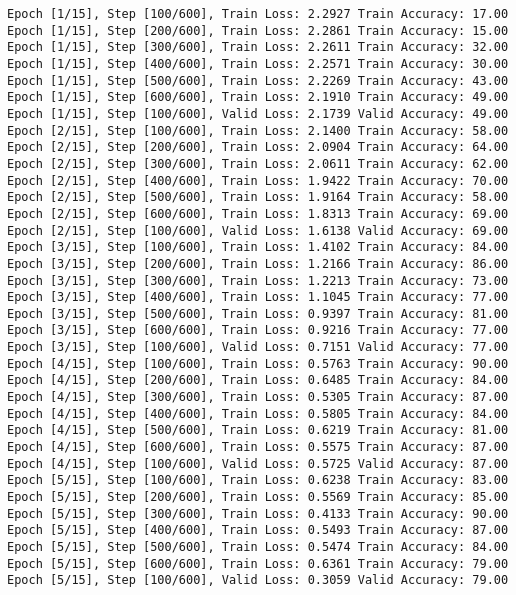 \documentclass[11pt]{article}
\begin{document}
    \begin{Verbatim}[commandchars=\\\{\}]
Epoch [1/15], Step [100/600], Train Loss: 2.2927 Train Accuracy: 17.00
Epoch [1/15], Step [200/600], Train Loss: 2.2861 Train Accuracy: 15.00
Epoch [1/15], Step [300/600], Train Loss: 2.2611 Train Accuracy: 32.00
Epoch [1/15], Step [400/600], Train Loss: 2.2571 Train Accuracy: 30.00
Epoch [1/15], Step [500/600], Train Loss: 2.2269 Train Accuracy: 43.00
Epoch [1/15], Step [600/600], Train Loss: 2.1910 Train Accuracy: 49.00
Epoch [1/15], Step [100/600], Valid Loss: 2.1739 Valid Accuracy: 49.00
Epoch [2/15], Step [100/600], Train Loss: 2.1400 Train Accuracy: 58.00
Epoch [2/15], Step [200/600], Train Loss: 2.0904 Train Accuracy: 64.00
Epoch [2/15], Step [300/600], Train Loss: 2.0611 Train Accuracy: 62.00
Epoch [2/15], Step [400/600], Train Loss: 1.9422 Train Accuracy: 70.00
Epoch [2/15], Step [500/600], Train Loss: 1.9164 Train Accuracy: 58.00
Epoch [2/15], Step [600/600], Train Loss: 1.8313 Train Accuracy: 69.00
Epoch [2/15], Step [100/600], Valid Loss: 1.6138 Valid Accuracy: 69.00
Epoch [3/15], Step [100/600], Train Loss: 1.4102 Train Accuracy: 84.00
Epoch [3/15], Step [200/600], Train Loss: 1.2166 Train Accuracy: 86.00
Epoch [3/15], Step [300/600], Train Loss: 1.2213 Train Accuracy: 73.00
Epoch [3/15], Step [400/600], Train Loss: 1.1045 Train Accuracy: 77.00
Epoch [3/15], Step [500/600], Train Loss: 0.9397 Train Accuracy: 81.00
Epoch [3/15], Step [600/600], Train Loss: 0.9216 Train Accuracy: 77.00
Epoch [3/15], Step [100/600], Valid Loss: 0.7151 Valid Accuracy: 77.00
Epoch [4/15], Step [100/600], Train Loss: 0.5763 Train Accuracy: 90.00
Epoch [4/15], Step [200/600], Train Loss: 0.6485 Train Accuracy: 84.00
Epoch [4/15], Step [300/600], Train Loss: 0.5305 Train Accuracy: 87.00
Epoch [4/15], Step [400/600], Train Loss: 0.5805 Train Accuracy: 84.00
Epoch [4/15], Step [500/600], Train Loss: 0.6219 Train Accuracy: 81.00
Epoch [4/15], Step [600/600], Train Loss: 0.5575 Train Accuracy: 87.00
Epoch [4/15], Step [100/600], Valid Loss: 0.5725 Valid Accuracy: 87.00
Epoch [5/15], Step [100/600], Train Loss: 0.6238 Train Accuracy: 83.00
Epoch [5/15], Step [200/600], Train Loss: 0.5569 Train Accuracy: 85.00
Epoch [5/15], Step [300/600], Train Loss: 0.4133 Train Accuracy: 90.00
Epoch [5/15], Step [400/600], Train Loss: 0.5493 Train Accuracy: 87.00
Epoch [5/15], Step [500/600], Train Loss: 0.5474 Train Accuracy: 84.00
Epoch [5/15], Step [600/600], Train Loss: 0.6361 Train Accuracy: 79.00
Epoch [5/15], Step [100/600], Valid Loss: 0.3059 Valid Accuracy: 79.00

\end{Verbatim}
\end{document}

